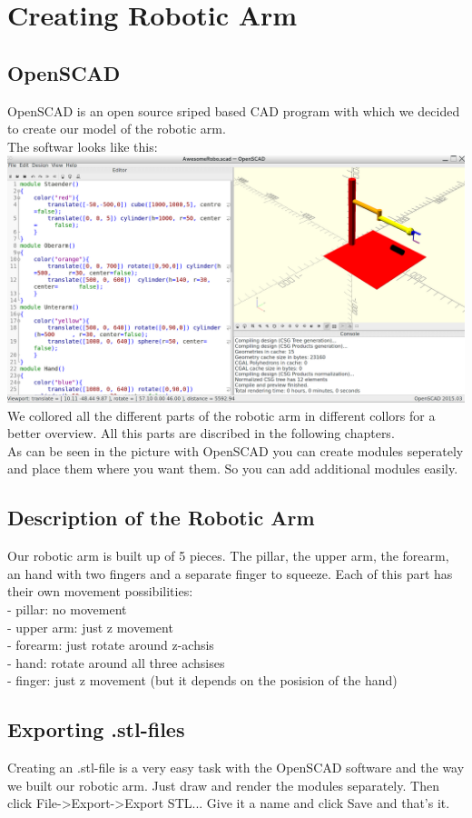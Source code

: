 \chapter{Creating Robotic Arm}

\section{OpenSCAD}
OpenSCAD is an open source sriped based CAD program with which we decided to create our model of the robotic arm.\\
The softwar looks like this:\\
\includegraphics[width=\textwidth]{imgs/OpenSCAD/SoftwareWindow.png}
We collored all the different parts of the robotic arm in different collors for a better overview. All this parts are discribed in the following chapters.\\
As can be seen in the picture with OpenSCAD you can create modules seperately and place them where you want them. So you can add additional modules easily.

\section{Description of the Robotic Arm}
Our robotic arm is built up of 5 pieces. The pillar, the upper arm, the forearm, an hand with two fingers and a separate finger to squeeze.
Each of this part has their own movement possibilities:\\
- pillar:		no movement\\
- upper arm:	just z movement\\
- forearm:		just rotate around z-achsis\\
- hand:			rotate around all three achsises\\
- finger:		just z movement (but it depends on the posision of the hand)
\section{Exporting .stl-files}
Creating an .stl-file is a very easy task with the OpenSCAD software and the way we built our robotic arm. Just draw and render the modules separately. Then click File->Export->Export STL... Give it a name and click Save and that's it.
\pagebreak
